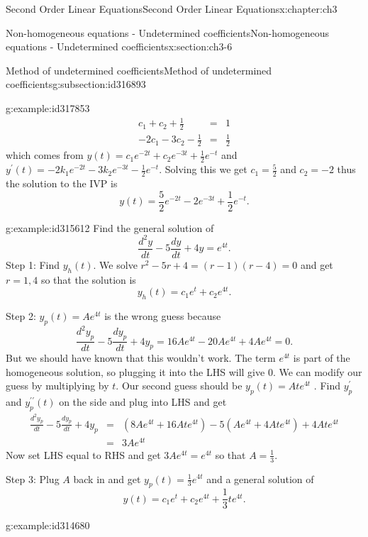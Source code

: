 \documentclass[oneside,10pt,]{book}
\numberwithin{equation}{section}
\numberwithin{equation}{section}
\newcommand{\amp}{&}
\begin{document}
\begin{chapterptx}{Second Order Linear Equations}{}{Second Order Linear Equations}{}{}{x:chapter:ch3}
\begin{sectionptx}{Non-homogeneous equations - Undetermined coefficients}{}{Non-homogeneous equations - Undetermined coefficients}{}{}{x:section:ch3-6}
\begin{subsectionptx}{Method of undetermined coefficients}{}{Method of undetermined coefficients}{}{}{g:subsection:id316893}
\begin{example}{}{g:example:id317853}
\begin{align*}
c_{1}+c_{2}+\frac{1}{2} \amp = \amp 1\\
-2c_{1}-3c_{2}-\frac{1}{2} \amp = \amp \frac{1}{2}
\end{align*}
which comes from \(y(t)=c_{1}e^{-2t}+c_{2}e^{-3t}+\frac{1}{2}e^{-t}\) and \(y^{\prime}(t)=-2k_{1}e^{-2t}-3k_{2}e^{-3t}-\frac{1}{2}e^{-t}.\) Solving this we get \(c_{1}=\frac{5}{2}\) and \(c_{2}=-2\) thus the solution to the IVP is%
\begin{equation*}
y(t)=\frac{5}{2}e^{-2t}-2e^{-3t}+\frac{1}{2}e^{-t}.
\end{equation*}
%
\end{example}
\begin{example}{}{g:example:id315612}%
Find the general solution of%
\begin{equation*}
\frac{d^{2}y}{dt}-5\frac{dy}{dt}+4y=e^{4t}.
\end{equation*}
Step 1: Find \(y_{h}(t)\). We solve \(r^{2}-5r+4=(r-1)(r-4)=0\) and get \(r=1,4\) so that the solution is%
\begin{equation*}
y_{h}(t)=c_{1}e^{t}+c_{2}e^{4t}.
\end{equation*}
%
\par
Step 2: \(y_{p}(t)=Ae^{4t}\) is the wrong guess because%
\begin{equation*}
\frac{d^{2}y_{p}}{dt}-5\frac{dy_{p}}{dt}+4y_{p}=16Ae^{4t}-20Ae^{4t}+4Ae^{4t}=0.
\end{equation*}
But we should have known that this wouldn't work. The term \(e^{4t}\) is part of the homogeneous solution, so plugging it into the LHS will give 0. We can modify our guess by multiplying by \(t\). Our second guess should be \(y_{p}(t)=Ate^{4t}\) . Find \(y_{p}^{\prime}\) and \(y_{p}^{\prime\prime}(t)\) on the side and plug into LHS and get%
\begin{align*}
\frac{d^{2}y_{p}}{dt}-5\frac{dy_{p}}{dt}+4y_{p} \amp = \amp \left(8Ae^{4t}+16Ate^{4t}\right)-5\left(Ae^{4t}+4Ate^{4t}\right)+4Ate^{4t}\\
\amp = \amp 3Ae^{4t}
\end{align*}
Now set LHS equal to RHS and get \(3Ae^{4t}=e^{4t}\) so that \(A=\frac{1}{3}\).%
\par
Step 3: Plug \(A\) back in and get \(y_{p}(t)=\frac{1}{3}e^{4t}\) and a general solution of%
\begin{equation*}
y(t)=c_{1}e^{t}+c_{2}e^{4t}+\frac{1}{3}te^{4t}.
\end{equation*}
%
\end{example}
\begin{example}{}{g:example:id314680}%

\end{example}
\end{subsectionptx}
\end{sectionptx}
\end{chapterptx}
\end{document}
